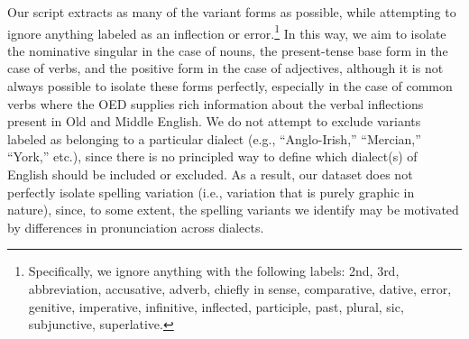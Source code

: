 \documentclass[doc,biblatex]{apa7}
\begin{document}
Our script extracts as many of the variant forms as possible, while attempting to ignore anything labeled as an inflection or error.\footnote{Specifically, we ignore anything with the following labels: 2nd, 3rd, abbreviation, accusative, adverb, chiefly in sense, comparative, dative, error, genitive, imperative, infinitive, inflected, participle, past, plural, sic, subjunctive, superlative.} In this way, we aim to isolate the nominative singular in the case of nouns, the present-tense base form in the case of verbs, and the positive form in the case of adjectives, although it is not always possible to isolate these forms perfectly, especially in the case of common verbs where the OED supplies rich information about the verbal inflections present in Old and Middle English. We do not attempt to exclude variants labeled as belonging to a particular dialect (e.g., ``Anglo-Irish,'' ``Mercian,'' ``York,'' etc.), since there is no principled way to define which dialect(s) of English should be included or excluded. As a result, our dataset does not perfectly isolate spelling variation (i.e., variation that is purely graphic in nature), since, to some extent, the spelling variants we identify may be motivated by differences in pronunciation across dialects.
\end{document}
